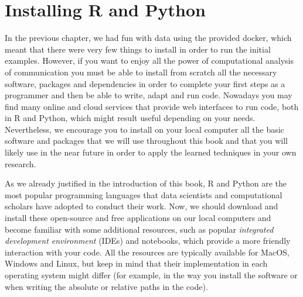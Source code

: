 \section{Installing R and Python}
\label{sec:installing}

In the previous chapter, we had fun with data using the provided
docker, which meant that there were very few things to install in
order to run the initial examples. However, if you want to enjoy all
the power of computational analysis of communication you must be able
to install from scratch all the necessary software, packages and
dependencies in order to complete your first steps as a programmer and
then be able to write, adapt and run code. Nowadays you may find many
online and cloud services that provide web interfaces to run code,
both in R and Python, which might result useful depending on your
needs. Nevertheless, we encourage you to install on your local
computer all the basic software and packages that we will use
throughout this book and that you will likely use in the near future
in order to apply the learned techniques in your own research.

As we already justified in the introduction of this book, R and Python
are the most popular programming languages that data scientists and
computational scholars have adopted to conduct their work.  Now, we
should download and install these open-source and free applications on
our local computers and become familiar with some additional
resources, such as popular \emph{integrated development environment}
(IDEs) and notebooks, which provide a more friendly interaction with
your code. All the resources are typically available for MacOS,
Windows and Linux, but keep in mind that their implementation in each
operating system might differ (for example, in the way you install the
software or when writing the absolute or relative paths in the code).

